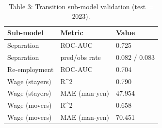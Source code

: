 \begin{table}
\caption{Table 3: Transition sub-model validation (test = 2023).}
\label{tab:table3_transition}
\begin{tabular}{lll}
\toprule
Sub-model & Metric & Value \\
\midrule
Separation & ROC-AUC & 0.725 \\
Separation & pred/obs rate & 0.082 / 0.083 \\
Re-employment & ROC-AUC & 0.704 \\
Wage (stayers) & R^2 & 0.790 \\
Wage (stayers) & MAE (man-yen) & 47.954 \\
Wage (movers) & R^2 & 0.658 \\
Wage (movers) & MAE (man-yen) & 70.451 \\
\bottomrule
\end{tabular}
\end{table}
